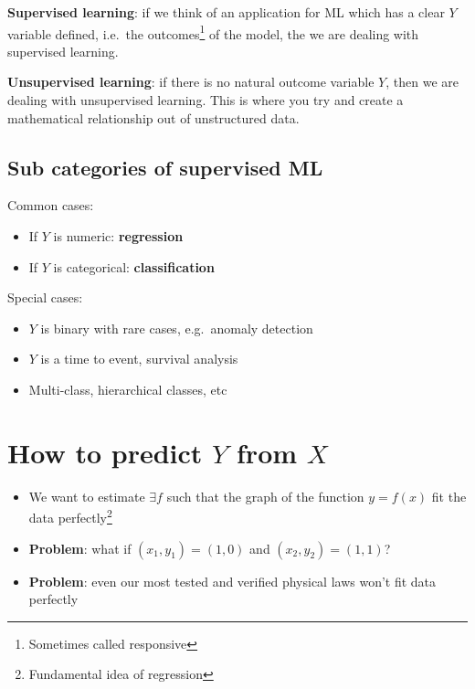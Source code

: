 \documentclass[
]{report}
\providecommand{\tightlist}{%
  \setlength{\itemsep}{0pt}\setlength{\parskip}{0pt}}
\theoremstyle{definition}
\theoremstyle{definition}
\theoremstyle{definition}
\theoremstyle{definition}
\theoremstyle{remark}
\begin{document}
\textbf{Supervised learning}: if we think of an application for ML which has a clear
\(Y\) variable defined, i.e.~the outcomes\footnote{Sometimes called responsive} of the
model, the we are dealing with supervised learning.

\textbf{Unsupervised learning}: if there is no natural outcome variable \(Y\), then we
are dealing with unsupervised learning. This is where you try and create a
mathematical relationship out of unstructured data.

\hypertarget{sub-categories-of-supervised-ml}{%
\subsection{Sub categories of supervised ML}\label{sub-categories-of-supervised-ml}}

Common cases:

\begin{itemize}
\tightlist
\item
  If \(Y\) is numeric: \textbf{regression}
\item
  If \(Y\) is categorical: \textbf{classification}
\end{itemize}

Special cases:

\begin{itemize}
\tightlist
\item
  \(Y\) is binary with rare cases, e.g.~anomaly detection
\item
  \(Y\) is a time to event, survival analysis
\item
  Multi-class, hierarchical classes, etc
\end{itemize}

\hypertarget{how-to-predict-y-from-x}{%
\section{\texorpdfstring{How to predict \(Y\) from \(X\)}{How to predict Y from X}}\label{how-to-predict-y-from-x}}

\begin{itemize}
\tightlist
\item
  We want to estimate \(\exists f\) such that the graph of the function \(y = f(x)\) fit the data perfectly\footnote{Fundamental idea of regression}
\item
  \textbf{Problem}: what if \((x_1, y_1) = (1, 0)\) and \((x_2, y_2) = (1, 1)\)?
\item
  \textbf{Problem}: even our most tested and verified physical laws won't fit data
  perfectly
\end{itemize}
\end{document}
